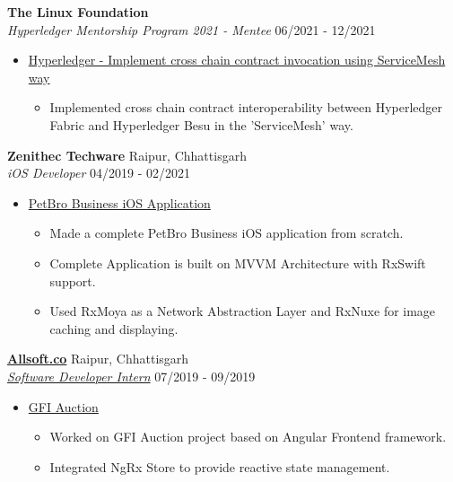 \documentclass{article}
\begin{document}
\noindent \normalsize \textbf{The Linux Foundation} \\
\textit{Hyperledger Mentorship Program 2021 - Mentee} \hfill 06/2021 - 12/2021
\begin{itemize}[noitemsep,nolistsep,leftmargin=*]
    \item {\normalsize \href{https://wiki.hyperledger.org/display/INTERN/Implement+cross+chain+contract+invocation+using+ServiceMesh+way}{Hyperledger - Implement cross chain contract invocation using ServiceMesh way}
        \begin{itemize}
            \item  Implemented cross chain contract interoperability between Hyperledger Fabric and Hyperledger Besu in the 'ServiceMesh' way.
        \end{itemize}
    }
\end{itemize}

\noindent \normalsize \textbf{Zenithec Techware} \hfill Raipur, Chhattisgarh \\
\textit{iOS Developer} \hfill 04/2019 - 02/2021
\begin{itemize}[noitemsep,nolistsep,leftmargin=*]
    \item {\normalsize \href{https://apple.co/3kAiLJ0}{PetBro Business iOS Application}
        \begin{itemize}
            \item Made a complete PetBro Business iOS application from scratch.
            \item Complete Application is built on MVVM Architecture with RxSwift support.
            \item Used RxMoya as a Network Abstraction Layer and RxNuxe for image caching and displaying.
        \end{itemize}
    }
\end{itemize}

\noindent \normalsize \href{https://bit.ly/allsoft_certificate}{\textbf{Allsoft.co}} \hfill Raipur, Chhattisgarh \\
\noindent \normalsize \textit{\href{https://bit.ly/allsoft_certificate}{Software Developer Intern}} \hfill 07/2019 - 09/2019
\begin{itemize}[noitemsep,nolistsep,leftmargin=*]
    \item {\normalsize \href{https://bit.ly/allsoft_certificate}{GFI Auction}
        \begin{itemize}
            \item Worked on GFI Auction project based on Angular Frontend framework.
            \item Integrated NgRx Store to provide reactive state management.
        \end{itemize}
    }
\end{itemize}
\end{document}
